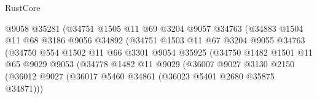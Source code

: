 \begin{lexlean}{RustCore}
\begin{coremodule}
                                    @9058
                                    @35281
                                    (@34751
                                      @1505
                                      @11
                                      @69
                                      @3204
                                      @9057
                                      @34763
                                      (@34883
                                        @1504
                                        @11
                                        @68
                                        @3186
                                        @9056
                                        @34892
                                        (@34751
                                          @1503
                                          @11
                                          @67
                                          @3204
                                          @9055
                                          @34763
                                          (@34750
                                            @554
                                            @1502
                                            @11
                                            @66
                                            @3301
                                            @9054
                                            @35925
                                            (@34750
                                              @1482
                                              @1501
                                              @11
                                              @65
                                              @9029
                                              @9053
                                              (@34778
                                                @1482
                                                @11
                                                @9029
                                                (@36007
                                                  @9027
                                                  @3130
                                                  @2150
                                                  (@36012
                                                    @9027
                                                    (@36017
                                                      @5460
                                                      @34861
                                                      (@36023 @5401 @2680 @35875 @34871)))

\end{coremodule}
\end{lexlean}
